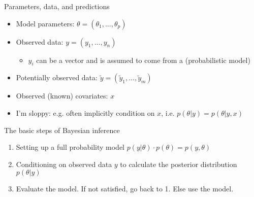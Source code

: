 \documentclass[10pt]{beamer}
\begin{document}
\begin{frame}{Parameters, data, and predictions}

  \begin{itemize}
  \item Model parameters: $\theta = (\theta_1,...,\theta_p)$
  \item Observed data: $y = (y_1,...,y_n)$
    \begin{itemize}
    \item $y_i$ can be a vector and is assumed to come from a  (probabilistic model)
    \end{itemize}
  \item Potentially observed data: $\tilde{y} = (\tilde{y}_1,...,\tilde{y}_m)$
  \item Observed (known) covariates: $x$
  \pause
  \item I'm sloppy: e.g. often implicitly condition on $x$, i.e. $p(\theta|y) = p(\theta|y, x)$
  \end{itemize}
\end{frame}



\begin{frame}{The basic steps of Bayesian inference}

  \begin{enumerate}
  \item Setting up a full probability model $p(y|\theta) \cdot p(\theta) = p(y,\theta)$ %
  \pause
  \item Conditioning on observed data $y$ to calculate the posterior distribution $p(\theta|y)$%
  \pause
  \item Evaluate the model. If not satisfied, go back to 1. Else use the model.%
   \end{enumerate}
\end{frame}
\end{document}

